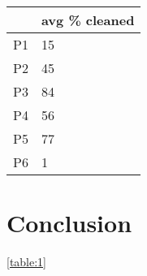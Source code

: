 \documentclass[letterpaper]{article}
\begin{document}
\begin{tabular}{ r | l }  
	\toprule
		& avg \% cleaned \\
	\midrule
	P1	& 15 \\
	P2	& 45 \\
	P3	& 84 \\
	P4	& 56 \\
	P5	& 77 \\
	P6	& 1 \\
	\bottomrule
\end{tabular}

\section{Conclusion}
\ref{table:1}
\listoftables
\listoffigures
\nocite{*}


\end{document}
